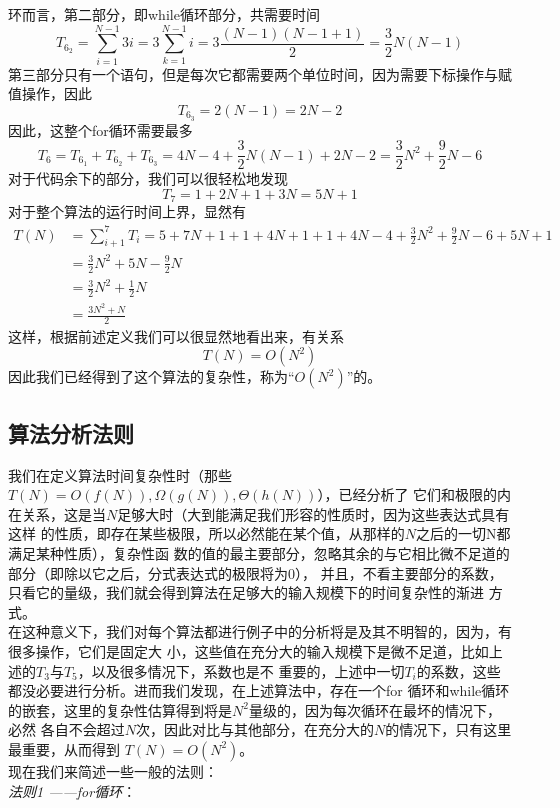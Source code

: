 \documentclass[a4paper,12pt]{ctexart}
\begin{document}
		环而言，第二部分，即while循环部分，共需要时间
		$$
		T_{6_2} = \sum_{i=1}^{N-1}3i=3\sum_{k=1}^{N-1}i=3\frac{(N-1)(N-1+1)}{2}=
		\frac{3}{2}N(N-1) 
		$$
		第三部分只有一个语句，但是每次它都需要两个单位时间，因为需要下标操作与赋值操作，因此
		$$
		T_{6_3}=2(N-1)=2N-2
		$$
		因此，这整个for循环需要最多
		$$
		T_6 = T_{6_1}+T_{6_2}+T_{6_3}=4N-4+\frac{3}{2}N(N-1)+2N-2=\frac{3}{2}N^2+
		\frac{9}{2}N-6
		$$
		对于代码余下的部分，我们可以很轻松地发现
		$$
		T_7=1+2N+1+3N=5N+1
		$$
		对于整个算法的运行时间上界，显然有
		\begin{align*}
				T(N)&=\sum_{i+1}^{7}T_i=5+7N+1+1+4N+1+1+4N-4+\frac{3}{2}N^2+\frac{9}
				{2}N-6+5N+1\\
				&=\frac{3}{2}N^2+5N-\frac{9}{2}N\\
				&=\frac{3}{2}N^2+\frac{1}{2}N\\
				&=\frac{3N^2+N}{2}
		\end{align*}
		这样，根据前述定义我们可以很显然地看出来，有关系
		$$
		T(N) = O(N^2)
		$$
		因此我们已经得到了这个算法的复杂性，称为“$O(N^2)$”的。
		
		\subsection{算法分析法则}
		\indent
		我们在定义算法时间复杂性时（那些$T(N)=O(f(N)),\Omega(g(N)),\Theta(h(N))$），已经分析了
		它们和极限的内在关系，这是当$N$足够大时（大到能满足我们形容的性质时，因为这些表达式具有这样
		的性质，即存在某些极限，所以必然能在某个值，从那样的$N$之后的一切N都满足某种性质），复杂性函
		数的值的最主要部分，忽略其余的与它相比微不足道的部分（即除以它之后，分式表达式的极限将为0），
		并且，不看主要部分的系数，只看它的量级，我们就会得到算法在足够大的输入规模下的时间复杂性的渐进
		方式。\\
		\indent
		在这种意义下，我们对每个算法都进行例子中的分析将是及其不明智的，因为，有很多操作，它们是固定大
		小，这些值在充分大的输入规模下是微不足道，比如上述的$T_3$与$T_5$，以及很多情况下，系数也是不
		重要的，上述中一切$T_i$的系数，这些都没必要进行分析。进而我们发现，在上述算法中，存在一个for
		循环和while循环的嵌套，这里的复杂性估算得到将是$N^2$量级的，因为每次循环在最坏的情况下，必然
		各自不会超过$N$次，因此对比与其他部分，在充分大的$N$的情况下，只有这里最重要，从而得到
		$T(N)=O(N^2)$。\\
		\indent
		现在我们来简述一些一般的法则：
		\\
		\indent \textit{法则1	——for循环}：
		\\
		\indent 
\end{document}
